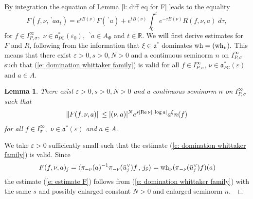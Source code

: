 \documentclass[12pt,a4paper]{article}
\newtheorem{Lemma}[Thm]{Lemma}
\newenvironment{lemma}[0]{\begin{Lemma}\noindent}%
{\end{Lemma}}
\def\proof{\par\noindent{\it Proof.}{\ }{\ }}
\def\qed{~\hfill\hbox{$\Box$}\medbreak}
\def\msy#1{{\mathbb #1}}
\def\C{{\msy C}}
\def\R{{\msy R}}
\def\ge{\varepsilon}
\def\gs{\sigma}
\def\got#1{\mathfrak #1}
\def\fa{{\got a}}
\def\Re{{\rm Re}\,}
\def\inp#1#2{\langle#1\,,\,#2\rangle}
\def\iC{{\scriptscriptstyle \C}}
\numberwithin{Thm}{section}
\numberwithin{equation}{section}
\def\faPdc{{\fa_{P\iC}^*}}
\numberwithin{equation}{section}
\def\fad{{\fa^*}}
\def\bp{\!{\,}^\backprime}
\def\faPdc{\fa_{P\iC}^*}
\def\snorm{n}
\def\IPgs{I_{P,\gs}^\infty}
\def\wh{{\rm wh}}
\def\xxi{\xi}
\def\veec{\vee}%
\begin{document}
By integration the 
equation of Lemma \ref{l: diff eq for F} leads to the equality
\begin{equation}
\label{e: integral equation with gl}
F(f,\nu, \bp aa_t) = e^{tB(\nu)} F(\bp a) + e^{tB(\nu)} \int_0^t e^{-\tau B(\nu)} R(f, \nu, a)\; d\tau,
\end{equation}
for $f \in \IPgs,$ $\nu \in \faPdc(\ge_0),$ $\bp a \in A_\Phi$ and $t \in \R.$
We will first derive estimates for $F$ and $R$, following from the information that
$\xxi \in \fad$  dominates $\wh = (\wh_\nu).$ This means that there exist $\ge > 0, s >0, N >0$ 
and a continuous seminorm $\snorm$ on $\IPgs$ such that (\ref{e: domination whittaker family}) is valid 
for all $f \in \IPgs$, $\nu \in \faPdc(\ge)$ and $a \in A.$   

\begin{lemma}
\label{l: estimate F}
There exist $\ge > 0, s>0, N > 0$ and a continuous seminorm $n$ on $\IPgs$ such that 
\begin{equation}
\label{e: estimate F}
\|F(f, \nu, a)\| \leq |(\nu,a)|^N e^{s |\Re \nu| |\log a| } a^\xxi \snorm(f)
\end{equation}
for all $f \in I_\gs^\infty,$  $\nu \in \fad(\ge)$ and $a\in A.$  
\end{lemma}

\proof 
We take $\ge >0$ sufficiently small such that the estimate (\ref{e: domination whittaker family})
is valid. 
Since 
$$ 
F(f, \nu, a)_j = \inp{   \pi_{-\nu}(a)^{-1} \pi_{-\nu}(\bar u_j^\veec)f     }{  j_{\bar\nu}}
=
\wh_\nu( \pi_{-\nu}(\bar u_j^\veec)f )(a)
$$ 
the estimate (\ref{e: estimate F}) follows from (\ref{e: domination whittaker family}) with 
the same $s$ and possibly enlarged constant $N> 0$ and enlarged  
seminorm $n.$
\qed
\end{document}
